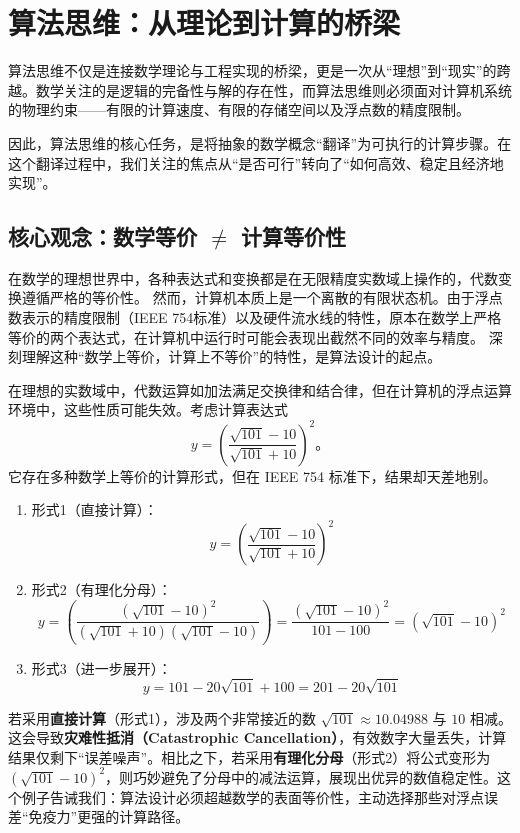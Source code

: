 \section{算法思维：从理论到计算的桥梁}
算法思维不仅是连接数学理论与工程实现的桥梁，更是一次从“理想”到“现实”的跨越。数学关注的是逻辑的完备性与解的存在性，而算法思维则必须面对计算机系统的物理约束——有限的计算速度、有限的存储空间以及浮点数的精度限制。

因此，算法思维的核心任务，是将抽象的数学概念“翻译”为可执行的计算步骤。在这个翻译过程中，我们关注的焦点从“是否可行”转向了“如何高效、稳定且经济地实现”。
\subsection{核心观念：数学等价 $\ne$ 计算等价性}

在数学的理想世界中，各种表达式和变换都是在无限精度实数域上操作的，代数变换遵循严格的等价性。
然而，计算机本质上是一个离散的有限状态机。由于浮点数表示的精度限制（IEEE 754标准）以及硬件流水线的特性，原本在数学上严格等价的两个表达式，在计算机中运行时可能会表现出截然不同的效率与精度。
深刻理解这种“数学上等价，计算上不等价”的特性，是算法设计的起点。


在理想的实数域中，代数运算如加法满足交换律和结合律，但在计算机的浮点运算环境中，这些性质可能失效。考虑计算表达式 
$$y = \left(\frac{\sqrt{101} - 10}{\sqrt{101} + 10}\right)^2。$$
它存在多种数学上等价的计算形式，但在 IEEE 754 标准下，结果却天差地别。
\begin{enumerate}
\item 形式1（直接计算）：$$y = \left(\frac{\sqrt{101} - 10}{\sqrt{101} + 10}\right)^2$$

\item 形式2（有理化分母）：
$$y = \left(\frac{(\sqrt{101} - 10)^2}{(\sqrt{101} + 10)(\sqrt{101} - 10)}\right) = \frac{(\sqrt{101} - 10)^2}{101 - 100} = (\sqrt{101} - 10)^2$$

\item 形式3（进一步展开）：
$$y = 101 - 20\sqrt{101} + 100 = 201 - 20\sqrt{101}$$
\end{enumerate}

若采用\textbf{直接计算}（形式1），涉及两个非常接近的数 $\sqrt{101} \approx 10.04988$ 与 $10$ 相减。这会导致\textbf{灾难性抵消（Catastrophic Cancellation）}，有效数字大量丢失，计算结果仅剩下“误差噪声”。相比之下，若采用\textbf{有理化分母}（形式2）将公式变形为 $(\sqrt{101} - 10)^2$，则巧妙避免了分母中的减法运算，展现出优异的数值稳定性。这个例子告诫我们：算法设计必须超越数学的表面等价性，主动选择那些对浮点误差“免疫力”更强的计算路径。

